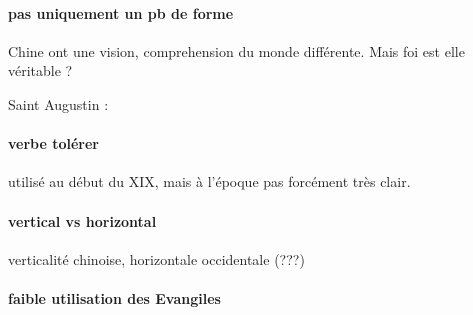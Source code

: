 \paragraph{pas uniquement un pb de forme} Chine ont une vision, comprehension du monde différente. Mais foi est elle véritable ?

Saint Augustin : 

\paragraph{verbe tolérer}utilisé au début du XIX, mais à l'époque pas forcément très clair.

\paragraph{vertical vs horizontal} verticalité chinoise, horizontale occidentale (???)

\paragraph{faible utilisation des Evangiles}



